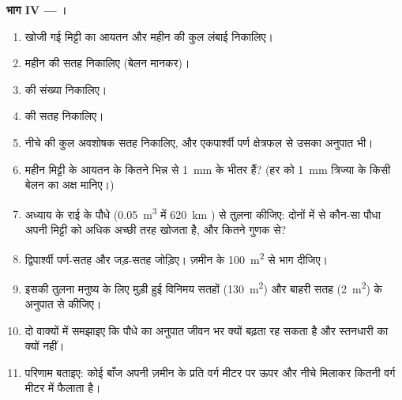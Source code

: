 \begin{problem}
\medskip
\noindent\textbf{भाग IV --- ।}
\begin{enumerate}[resume]
  \item खोजी गई मिट्टी का आयतन और महीन  की कुल लंबाई निकालिए।
  \item महीन  की सतह निकालिए (बेलन मानकर)।
  \item {} की संख्या निकालिए।
  \item {} की सतह निकालिए।
  \item नीचे की कुल अवशोषक सतह निकालिए, और एकपार्श्वी पर्ण क्षेत्रफल
        से उसका अनुपात भी।
  \item महीन  मिट्टी के आयतन के कितने भिन्न से \qty{1}{mm} के
        भीतर हैं? (हर  को \qty{1}{mm} त्रिज्या के किसी बेलन का अक्ष
        मानिए।)
  \item अध्याय के राई के पौधे (\qty{0.05}{m^3} में \qty{620}{km} )
        से तुलना कीजिए: दोनों में से कौन-सा पौधा अपनी मिट्टी को अधिक
        अच्छी तरह खोजता है, और कितने गुणक से?
  \item द्विपार्श्वी पर्ण-सतह और जड़-सतह जोड़िए। ज़मीन के
        \qty{100}{m^2} से भाग दीजिए।
  \item इसकी तुलना मनुष्य के लिए मुड़ी हुई विनिमय सतहों
        (\qty{130}{m^2}) और बाहरी सतह (\qty{2}{m^2}) के अनुपात से
        कीजिए।
  \item दो वाक्यों में समझाइए कि पौधे का अनुपात जीवन भर क्यों बढ़ता रह
        सकता है और स्तनधारी का क्यों नहीं।
  \item परिणाम बताइए: कोई बाँज अपनी ज़मीन के प्रति वर्ग मीटर पर ऊपर और
        नीचे मिलाकर कितनी  वर्ग मीटर में फैलाता है।
\end{enumerate}
\end{problem}
